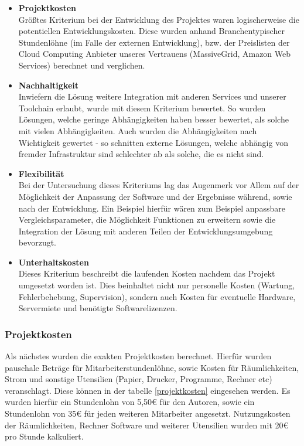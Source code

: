 \begin{itemize}
    \item \textbf{Projektkosten}\\
    Größtes Kriterium bei der Entwicklung des Projektes waren logischerweise die
     potentiellen Entwicklungskosten. Diese wurden anhand Branchentypischer Stundenlöhne
     (im Falle der externen Entwicklung), bzw. der Preislisten der Cloud Computing
     Anbieter unseres Vertrauens (MassiveGrid, Amazon Web Services) berechnet und verglichen.

    \item \textbf{Nachhaltigkeit}\\
    Inwiefern die Lösung weitere Integration mit anderen Services und unserer
    Toolchain erlaubt, wurde mit diesem Kriterium bewertet. So wurden Lösungen, welche 
    geringe Abhängigkeiten haben besser bewertet, als solche mit vielen Abhängigkeiten.
    Auch wurden die Abhängigkeiten nach Wichtigkeit gewertet - so schnitten externe Lösungen, welche
    abhängig von fremder Infrastruktur sind schlechter ab als solche, die es nicht sind.\\

    \item \textbf{Flexibilität}\\
    Bei der Untersuchung dieses Kriteriums lag das Augenmerk vor Allem auf der
    Möglichkeit der Anpassung der Software und der Ergebnisse während,
    sowie nach der Entwicklung. Ein Beispiel hierfür wären zum Beispiel anpassbare
    Vergleichsparameter, die Möglichkeit Funktionen zu erweitern sowie die Integration der
    Lösung mit anderen Teilen der Entwicklungsumgebung bevorzugt.

    \item \textbf{Unterhaltskosten}\\
    Dieses Kriterium beschreibt die laufenden Kosten nachdem das Projekt umgesetzt 
    worden ist. Dies beinhaltet nicht nur personelle Kosten (Wartung, Fehlerbehebung, 
    Supervision), sondern auch Kosten für eventuelle Hardware, Servermiete und 
    benötigte Softwarelizenzen.
\end{itemize}



\subsubsection{Projektkosten}
Als nächstes wurden die exakten Projektkosten berechnet. Hierfür wurden pauschale Beträge 
für Mitarbeiterstundenlöhne, sowie Kosten für Räumlichkeiten, Strom und sonstige Utensilien 
(Papier, Drucker, Programme, Rechner etc) veranschlagt. Diese können in der tabelle 
\ref{projektkosten} eingesehen werden. Es wurden hierfür ein Stundenlohn von 5,50€ für den 
Autoren, sowie ein Stundenlohn von 35€ für jeden weiteren Mitarbeiter angesetzt. Nutzungskosten 
der Räumlichkeiten, Rechner Software und weiterer Utensilien wurden mit 20€ pro Stunde kalkuliert. \par


